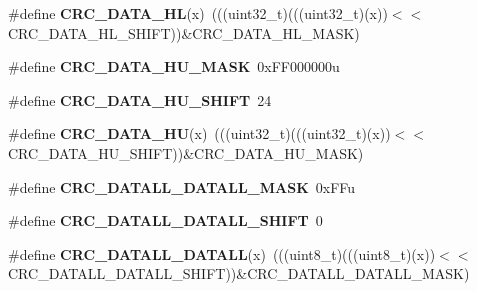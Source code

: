 \begin{DoxyCompactItemize}
\item 
\#define {\bfseries C\+R\+C\+\_\+\+D\+A\+T\+A\+\_\+\+HL}(x)~(((uint32\+\_\+t)(((uint32\+\_\+t)(x))$<$$<$C\+R\+C\+\_\+\+D\+A\+T\+A\+\_\+\+H\+L\+\_\+\+S\+H\+I\+FT))\&C\+R\+C\+\_\+\+D\+A\+T\+A\+\_\+\+H\+L\+\_\+\+M\+A\+SK)\hypertarget{group__CRC__Register__Masks_gab48aad72696d318bf010c7e0c54cc95b}{}\label{group__CRC__Register__Masks_gab48aad72696d318bf010c7e0c54cc95b}

\item 
\#define {\bfseries C\+R\+C\+\_\+\+D\+A\+T\+A\+\_\+\+H\+U\+\_\+\+M\+A\+SK}~0x\+F\+F000000u\hypertarget{group__CRC__Register__Masks_ga30fc9246793f0817a1907bc0f9080487}{}\label{group__CRC__Register__Masks_ga30fc9246793f0817a1907bc0f9080487}

\item 
\#define {\bfseries C\+R\+C\+\_\+\+D\+A\+T\+A\+\_\+\+H\+U\+\_\+\+S\+H\+I\+FT}~24\hypertarget{group__CRC__Register__Masks_ga0b68b41e3667c6904623c59fcd3d6c62}{}\label{group__CRC__Register__Masks_ga0b68b41e3667c6904623c59fcd3d6c62}

\item 
\#define {\bfseries C\+R\+C\+\_\+\+D\+A\+T\+A\+\_\+\+HU}(x)~(((uint32\+\_\+t)(((uint32\+\_\+t)(x))$<$$<$C\+R\+C\+\_\+\+D\+A\+T\+A\+\_\+\+H\+U\+\_\+\+S\+H\+I\+FT))\&C\+R\+C\+\_\+\+D\+A\+T\+A\+\_\+\+H\+U\+\_\+\+M\+A\+SK)\hypertarget{group__CRC__Register__Masks_ga618e11d84c3e51f8d767a021dbfc4e94}{}\label{group__CRC__Register__Masks_ga618e11d84c3e51f8d767a021dbfc4e94}

\item 
\#define {\bfseries C\+R\+C\+\_\+\+D\+A\+T\+A\+L\+L\+\_\+\+D\+A\+T\+A\+L\+L\+\_\+\+M\+A\+SK}~0x\+F\+Fu\hypertarget{group__CRC__Register__Masks_ga7f99e19de9e3e19206c47c202c96bb5c}{}\label{group__CRC__Register__Masks_ga7f99e19de9e3e19206c47c202c96bb5c}

\item 
\#define {\bfseries C\+R\+C\+\_\+\+D\+A\+T\+A\+L\+L\+\_\+\+D\+A\+T\+A\+L\+L\+\_\+\+S\+H\+I\+FT}~0\hypertarget{group__CRC__Register__Masks_ga16cc13b7d931b2080c8de506cae34fcb}{}\label{group__CRC__Register__Masks_ga16cc13b7d931b2080c8de506cae34fcb}

\item 
\#define {\bfseries C\+R\+C\+\_\+\+D\+A\+T\+A\+L\+L\+\_\+\+D\+A\+T\+A\+LL}(x)~(((uint8\+\_\+t)(((uint8\+\_\+t)(x))$<$$<$C\+R\+C\+\_\+\+D\+A\+T\+A\+L\+L\+\_\+\+D\+A\+T\+A\+L\+L\+\_\+\+S\+H\+I\+FT))\&C\+R\+C\+\_\+\+D\+A\+T\+A\+L\+L\+\_\+\+D\+A\+T\+A\+L\+L\+\_\+\+M\+A\+SK)\hypertarget{group__CRC__Register__Masks_ga92ae41280f6cede9a6d61d944b9bdbed}{}\label{group__CRC__Register__Masks_ga92ae41280f6cede9a6d61d944b9bdbed}


\end{DoxyCompactItemize}
